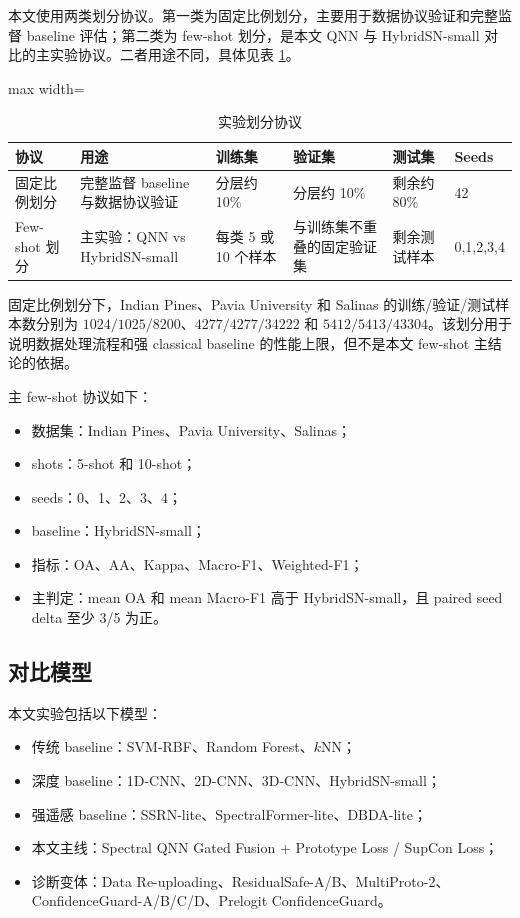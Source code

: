 \documentclass[UTF8,a4paper,zihao=-4,fontset=fandol]{ctexart}
\begin{document}
本文使用两类划分协议。第一类为固定比例划分，主要用于数据协议验证和完整监督 baseline 评估；第二类为 few-shot 划分，是本文 QNN 与 HybridSN-small 对比的主实验协议。二者用途不同，具体见表 \ref{tab:split-protocol}。

\begin{table}[htbp]
\centering
\caption{实验划分协议}
\label{tab:split-protocol}
\begin{adjustbox}{max width=\textwidth}
\begin{tabular}{llllll}
\toprule
协议 & 用途 & 训练集 & 验证集 & 测试集 & Seeds \\
\midrule
固定比例划分 & 完整监督 baseline 与数据协议验证 & 分层约 10\% & 分层约 10\% & 剩余约 80\% & 42 \\
Few-shot 划分 & 主实验：QNN vs HybridSN-small & 每类 5 或 10 个样本 & 与训练集不重叠的固定验证集 & 剩余测试样本 & 0,1,2,3,4 \\
\bottomrule
\end{tabular}
\end{adjustbox}
\end{table}

固定比例划分下，Indian Pines、Pavia University 和 Salinas 的训练/验证/测试样本数分别为 $1024/1025/8200$、$4277/4277/34222$ 和 $5412/5413/43304$。该划分用于说明数据处理流程和强 classical baseline 的性能上限，但不是本文 few-shot 主结论的依据。

主 few-shot 协议如下：

\begin{itemize}
  \item 数据集：Indian Pines、Pavia University、Salinas；
  \item shots：5-shot 和 10-shot；
  \item seeds：0、1、2、3、4；
  \item baseline：HybridSN-small；
  \item 指标：OA、AA、Kappa、Macro-F1、Weighted-F1；
  \item 主判定：mean OA 和 mean Macro-F1 高于 HybridSN-small，且 paired seed delta 至少 3/5 为正。
\end{itemize}

\subsection{对比模型}

本文实验包括以下模型：

\begin{itemize}
  \item 传统 baseline：SVM-RBF、Random Forest、$k$NN；
  \item 深度 baseline：1D-CNN、2D-CNN、3D-CNN、HybridSN-small；
  \item 强遥感 baseline：SSRN-lite、SpectralFormer-lite、DBDA-lite；
  \item 本文主线：Spectral QNN Gated Fusion + Prototype Loss / SupCon Loss；
  \item 诊断变体：Data Re-uploading、ResidualSafe-A/B、MultiProto-2、ConfidenceGuard-A/B/C/D、Prelogit ConfidenceGuard。
\end{itemize}
\end{document}
